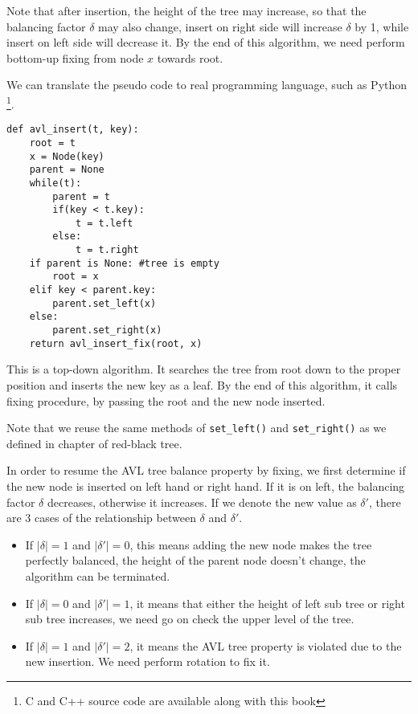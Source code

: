 \documentclass{article}
\begin{document}
Note that after insertion, the height of the tree may increase, so that
the balancing factor $\delta$ may also change, insert on right side will
increase $\delta$ by 1, while insert on left side will decrease it. By
the end of this algorithm, we need perform bottom-up fixing from node $x$
towards root.

We can translate the pseudo code to real programming language, such as
Python \footnote{C and C++ source code are available along with this book}.
\lstset{language=Python}
\begin{lstlisting}
def avl_insert(t, key):
    root = t
    x = Node(key)
    parent = None
    while(t):
        parent = t
        if(key < t.key):
            t = t.left
        else:
            t = t.right
    if parent is None: #tree is empty
        root = x
    elif key < parent.key:
        parent.set_left(x)
    else:
        parent.set_right(x)
    return avl_insert_fix(root, x)
\end{lstlisting}

This is a top-down algorithm. It searches the tree from root down to the proper
position and inserts the new key as a leaf. By the end of this algorithm, it calls fixing procedure, by passing the root and the new node inserted.

Note that we reuse the same methods of \texttt{set\_left()} and \texttt{set\_right()} as
we defined in chapter of red-black tree.

In order to resume the AVL tree balance property by fixing, we first determine if the new node is inserted on left hand or right hand. If it is on left, the balancing factor $\delta$ decreases, otherwise it increases. If we denote the new value as $\delta'$, there are 3 cases of the relationship between $\delta$ and $\delta'$.

\begin{itemize}
\item If $|\delta| = 1$ and $|\delta'| = 0$, this means adding the new node makes the tree perfectly balanced, the height of the parent node doesn't change, the algorithm can be terminated.

\item If $|\delta| = 0$ and $|\delta'| = 1$, it means that either the height of left sub tree or right sub tree increases, we need go on check the upper level of the tree.

\item If $|\delta| = 1$ and $|\delta'| = 2$, it means the AVL tree property is violated due to the new insertion. We need perform rotation to fix it.
\end{itemize}
\end{document}
